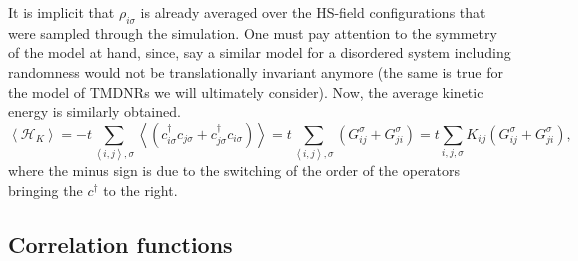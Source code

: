 It is implicit that $\rho_{i\sigma}$ is already averaged over the HS-field configurations that were sampled through the simulation.
One must pay attention to the symmetry of the model at hand, since, say a similar model for a disordered system including randomness would not be translationally invariant anymore (the same is true for the model of \acs{TMDNR}s we will ultimately consider).
Now, the average kinetic energy is similarly obtained.
\begin{equation}
\left\langle \mathcal{H}_K \right\rangle = - t  \sum_{\left\langle i, j \right\rangle , \sigma} \left\langle ( c_{i\sigma}^\dagger c_{j\sigma} + c_{j\sigma}^\dagger c_{i\sigma} ) \right\rangle = t \sum_{\left\langle i, j \right\rangle , \sigma} ( G_{ij}^\sigma + G_{ji}^\sigma ) = t \sum_{ i, j , \sigma} K_{ij} ( G_{ij}^\sigma + G_{ji}^\sigma )  ,
\end{equation}
where the minus sign is due to the switching of the order of the operators bringing the $c^\dagger$ to the right.

\subsection{Correlation functions}

